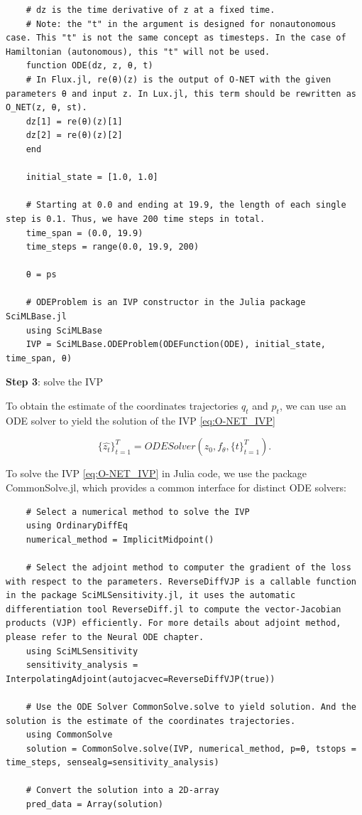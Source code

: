 \documentclass[
	parskip, 			   %
	twoside, 			   %
	DIV=14, 			   %
	BCOR=15.0mm, 		   %
	headsepline, 		   %
	open=right, 		   %
	captions=tableheading, %
	bibliography=totoc,    %
	numbers=noenddot       %
]{scrreprt}
\begin{document}
\begin{verbatim}
    # dz is the time derivative of z at a fixed time.
    # Note: the "t" in the argument is designed for nonautonomous case. This "t" is not the same concept as timesteps. In the case of Hamiltonian (autonomous), this "t" will not be used.
    function ODE(dz, z, θ, t)
    # In Flux.jl, re(θ)(z) is the output of O-NET with the given parameters θ and input z. In Lux.jl, this term should be rewritten as O_NET(z, θ, st).
    dz[1] = re(θ)(z)[1]
    dz[2] = re(θ)(z)[2]
    end
    
    initial_state = [1.0, 1.0]
    
    # Starting at 0.0 and ending at 19.9, the length of each single step is 0.1. Thus, we have 200 time steps in total.
    time_span = (0.0, 19.9)
    time_steps = range(0.0, 19.9, 200)
    
    θ = ps
    
    # ODEProblem is an IVP constructor in the Julia package SciMLBase.jl
    using SciMLBase
    IVP = SciMLBase.ODEProblem(ODEFunction(ODE), initial_state, time_span, θ)
\end{verbatim}

\textbf{Step 3}: solve the IVP

To obtain the estimate of the coordinates trajectories $q_t$ and $p_t$, we can use an ODE solver to yield the solution of the IVP \ref{eq:O-NET_IVP}

\begin{equation}
    \label{eq:O-NET_ODESolver}
    \{ \hat{z_{t}} \}_{t=1}^{T} = ODESolver(z_{0}, f_{\theta}, \{ t \}_{t=1}^{T}).
\end{equation}

To solve the IVP \ref{eq:O-NET_IVP} in Julia code, we use the package CommonSolve.jl, which provides a common interface for distinct ODE solvers:

\begin{verbatim}
    # Select a numerical method to solve the IVP
    using OrdinaryDiffEq
    numerical_method = ImplicitMidpoint()
    
    # Select the adjoint method to computer the gradient of the loss with respect to the parameters. ReverseDiffVJP is a callable function in the package SciMLSensitivity.jl, it uses the automatic differentiation tool ReverseDiff.jl to compute the vector-Jacobian products (VJP) efficiently. For more details about adjoint method, please refer to the Neural ODE chapter.
    using SciMLSensitivity
    sensitivity_analysis = InterpolatingAdjoint(autojacvec=ReverseDiffVJP(true))
    
    # Use the ODE Solver CommonSolve.solve to yield solution. And the solution is the estimate of the coordinates trajectories.
    using CommonSolve
    solution = CommonSolve.solve(IVP, numerical_method, p=θ, tstops = time_steps, sensealg=sensitivity_analysis)
    
    # Convert the solution into a 2D-array
    pred_data = Array(solution)
\end{verbatim}
\end{document}
